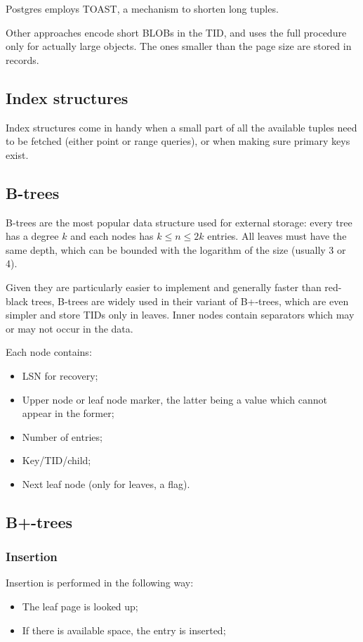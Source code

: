 Postgres employs TOAST, a mechanism to shorten long tuples.

Other approaches encode short BLOBs in the TID, and uses the full procedure only for actually large objects. The ones smaller than the page size are stored in records.

\subsection{Index structures}
Index structures come in handy when a small part of all the available tuples need to be fetched (either point or range queries), or when making sure primary keys exist. 


\subsection{B-trees}
B-trees are the most popular data structure used for external storage: every tree has a degree $k$ and each nodes has $k \leq n \leq 2k$ entries. All leaves must have the same depth, which can be bounded with the logarithm of the size (usually 3 or 4).

Given they are particularly easier to implement and generally faster than red-black trees, B-trees are widely used in their variant of B+-trees, which are even simpler and store TIDs only in leaves. Inner nodes contain separators which may or may not occur in the data.

Each node contains:
\begin{itemize}
	\item LSN for recovery;
	\item Upper node or leaf node marker, the latter being a value which cannot appear in the former;
	\item Number of entries;
	\item Key/TID/child;
	\item Next leaf node (only for leaves, a flag).
\end{itemize}


\subsection{B+-trees}
\subsubsection{Insertion}
Insertion is performed in the following way:
\begin{itemize}
	\item The leaf page is looked up;
	\item If there is available space, the entry is inserted;
\end{itemize}

